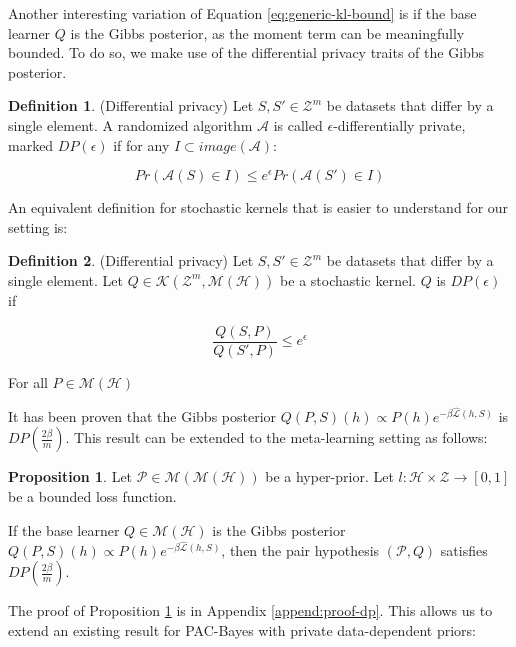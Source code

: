 \documentclass{article}
\theoremstyle{definition}
\newtheorem{defn}{Definition}[section]
\newtheorem{proposition}{Proposition}[section]
\begin{document}
Another interesting variation of Equation \ref{eq:generic-kl-bound} is if the base learner $Q$ is the Gibbs posterior, as the moment term can be meaningfully bounded. To do so, we make use of the differential privacy traits of the Gibbs posterior.

\begin{defn} (Differential privacy)
	Let $S,S'\in \mathcal{Z}^m$ be datasets that differ by a single element.
	A randomized algorithm $\mathcal{A}$ is called  $\epsilon$-differentially private, marked $DP(\epsilon)$ if for any $I\subset image(\mathcal{A})$:
	
	$$Pr(\mathcal{A}(S)\in I)\leq e^\epsilon Pr(\mathcal{A}(S')\in I)$$
\end{defn}

An equivalent definition for stochastic kernels that is easier to understand for our setting is:

\begin{defn} (Differential privacy)
	Let $S,S'\in \mathcal{Z}^m$ be datasets that differ by a single element.
	Let $Q\in \mathcal{K}(\mathcal{Z}^m, \mathcal{M}(\mathcal{H}))$ be a stochastic kernel.
	$Q$ is $DP(\epsilon)$ if 
	
	$$\frac{Q(S, P)}{Q(S', P)} \leq e^\epsilon$$
	
	For all $P\in  \mathcal{M}(\mathcal{H})$
\end{defn}

It has been proven \citep{McSherry2007, Rivasplata2020} that the Gibbs posterior $Q(P, S)(h)\propto P(h)e^{-\beta\hat{\mathcal{L}}(h, S)}$ is $DP\left (\frac{2\beta}{m}\right )$.
This result can be extended to the meta-learning setting as follows:

\begin{proposition} \label{thm:pair-is-dp}
	Let $\mathcal{P}\in \mathcal{M}(\mathcal{M}(\mathcal{H}))$ be a hyper-prior.
	Let $l:\mathcal{H}\times \mathcal{Z}\rightarrow [0,1]$ be a bounded loss function.
	
	If the base learner $Q\in \mathcal{M}(\mathcal{H})$ is the Gibbs posterior $Q(P, S)(h)\propto P(h)e^{-\beta\hat{\mathcal{L}}(h, S)}$, 
	then the pair hypothesis $(\mathcal{P}, Q)$ satisfies $DP\left (\frac{2\beta}{m}\right )$.
\end{proposition}

The proof of Proposition \ref{thm:pair-is-dp} is in Appendix \ref{append:proof-dp}. This  allows us to extend an existing result for PAC-Bayes with private data-dependent priors:
\end{document}

